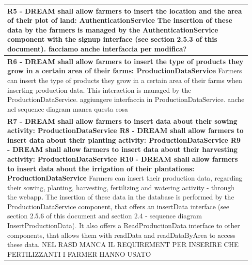 \documentclass{article}
\begin{document}
\begin{longtable}[c]{|m{11.75cm}|}
    \textbf{R5 - DREAM shall allow farmers to insert the location and the area of their plot
    of land: AuthenticationService}
    \newline\newline
    The insertion of these data by the farmers is managed by the AuthenticationService component with the signup interface (see section 2.5.3 of this document).
    \color{red}
    facciamo anche interfaccia per modifica?
    \color{black} \\
    \hline
    
    \textbf{R6 - DREAM shall allow farmers to insert the type of products they grow in a
    certain area of their farms: ProductionDataService}
    \newline\newline
    Farmers can insert the type of products they grow in a certain area of their farms when inserting production data. This interaction is managed by the ProductionDataService.
    \color{red}
    aggiungere interfaccia in ProductionDataService.
    anche nel sequence diagram manca questa cosa
    \color{black} \\
    \hline
    
    \textbf{R7 - DREAM shall allow farmers to insert data about their sowing activity: ProductionDataService
    \newline\newline
    R8 - DREAM shall allow farmers to insert data about their planting activity: ProductionDataService
    \newline\newline
    R9 - DREAM shall allow farmers to insert data about their harvesting activity: ProductionDataService
    \newline\newline
    R10 - DREAM shall allow farmers to insert data about the irrigation of their plantations: ProductionDataService}
    \newline\newline
    Farmers can insert their production data, regarding their sowing, planting, harvesting, fertilizing and watering activity - through the webapp. The insertion of these data in the database is performed by the ProductionDataService component, that offers an insertData interface (see section 2.5.6 of this document and section 2.4 - sequence diagram InsertProductionData).
    It also offers a ReadProductionData interface to other components, that allows them with readData and readDataByArea to access these data.
    \color{red}
    NEL RASD MANCA IL REQUIREMENT PER INSERIRE CHE FERTILIZZANTI I FARMER HANNO USATO
    \color{black} \\
    \hline
    

\end{longtable}
\end{document}
